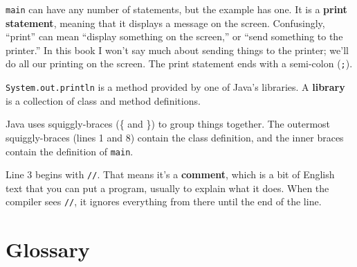\documentclass[12pt]{book}
\theoremstyle{exercise}
\begin{document}

{\tt main} can have any number of statements, but the example has one.
It is a {\bf print statement}, meaning that it displays a message on
the screen.  Confusingly, ``print'' can mean ``display something on
the screen,'' or ``send something to the printer.''  In this book I
won't say much about sending things to the printer; we'll do all our
printing on the screen.  The print statement ends with a semi-colon
({\tt ;}).

{\tt System.out.println} is a method provided by one of Java's
libraries.  A {\bf library} is a collection of class and method
definitions.

Java uses squiggly-braces (\{ and \}) to group things together.  The
outermost squiggly-braces (lines 1 and 8) contain the class
definition, and the inner braces contain the definition of {\tt main}.


Line 3 begins with {\tt //}.  That means it's
a {\bf comment}, which is a bit of
English text that you can put a program,
usually to explain what it does.  When the compiler
sees {\tt //}, it ignores everything from there until the end
of the line.


\section{Glossary}
\end{document}
